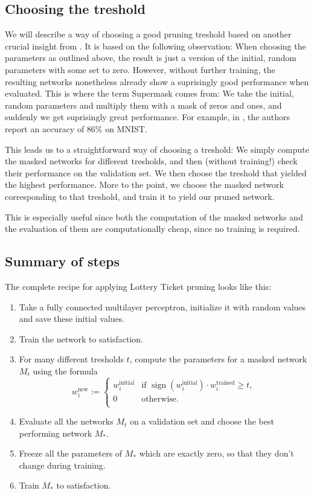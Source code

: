 \documentclass[12pt,final,twoside]{article}
\theoremstyle{plain}
\theoremstyle{definition}
\theoremstyle{remark}
\theoremstyle{named}
\begin{document}
\subsection{Choosing the treshold}
We will describe a way of choosing a good pruning treshold based on another crucial insight from \cite{supermask}. It is based on the following observation: When choosing the parameters as outlined above, the result is just a version of the initial, random parameters with some set to zero. However, without further training, the resulting networks nonetheless already show a suprisingly good performance when evaluated. This is where the term Supermask comes from: We take the initial, random parameters and multiply them with a mask of zeros and ones, and suddenly we get suprisingly great performance. For example, in \cite{supermask}, the authors report an accuracy of $86\%$ on MNIST.

This leads us to a straightforward way of choosing a treshold: We simply compute the masked networks for different tresholds, and then (without training!) check their performance on the validation set. We then choose the treshold that yielded the highest performance. More to the point, we choose the masked network corresponding to that treshold, and train it to yield our pruned network.

This is especially useful since both the computation of the masked networks and the evaluation of them are computationally cheap, since no training is required.

\subsection{Summary of steps}
The complete recipe for applying Lottery Ticket pruning looks like this:
\begin{enumerate}
\item Take a fully connected multilayer perceptron, initialize it with random values and save these initial values.
\item Train the network to satisfaction.
\item For many different tresholds $t$, compute the parameters for a masked network $M_t$ using the formula
$$
w_i^{\text{new}} := \begin{cases}
w_i^{\text{initial}} & \text{if } \operatorname{sign}\left(w_i^{\text{initial}} \right) \cdot w_i^{\text{trained}} \geq t, \\ 
0 & \text{otherwise.} \\
\end{cases}
$$
\item Evaluate all the networks $M_t$ on a validation set and choose the best performing network $M_\ast$.
\item Freeze all the parameters of $M_\ast$ which are exactly zero, so that they don't change during training.
\item Train $M_\ast$ to satisfaction.
\end{enumerate}
\end{document}
